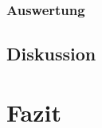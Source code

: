 \documentclass[12pt,a4paper]{article}
\begin{document}
\subsubsection{Auswertung}
\subsection{Diskussion}
\section{Fazit}
\end{document}
